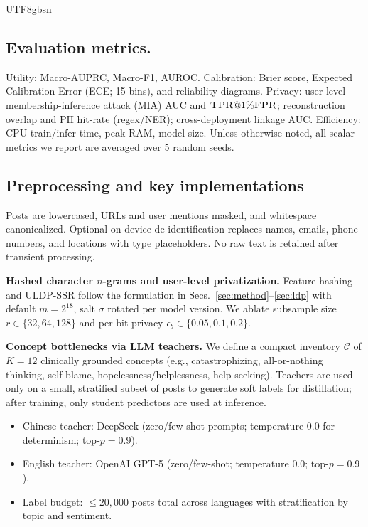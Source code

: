 \documentclass[lettersize,journal]{IEEEtran}
\begin{document}
\begin{CJK*}{UTF8}{gbsn}
\subsection{Evaluation metrics.}
Utility: Macro-\textsc{AUPRC}, Macro-\textsc{F1}, \textsc{AUROC}.
Calibration: Brier score, Expected Calibration Error (ECE; 15 bins), and reliability diagrams.
Privacy: user-level membership-inference attack (\textsc{MIA}) \textsc{AUC} and $\textsc{TPR}@1\%\textsc{FPR}$; reconstruction overlap and \textsc{PII} hit-rate (regex/\textsc{NER}); cross-deployment linkage \textsc{AUC}.
Efficiency: CPU train/infer time, peak RAM, model size. Unless otherwise noted, all scalar metrics we report are averaged over $5$ random seeds.


\subsection{Preprocessing and key implementations}
Posts are lowercased, URLs and user mentions masked, and whitespace canonicalized. Optional on-device de-identification replaces names, emails, phone numbers, and locations with type placeholders. No raw text is retained after transient processing.

\noindent\textbf{Hashed character $n$-grams and user-level privatization.}
Feature hashing and ULDP-SSR follow the formulation in Secs.~\ref{sec:method}--\ref{sec:ldp} with default $m{=}2^{18}$, salt $\sigma$ rotated per model version. We ablate subsample size $r \in \{32,64,128\}$ and per-bit privacy $\epsilon_b \in \{0.05,0.1,0.2\}$.


\noindent\textbf{Concept bottlenecks via LLM teachers.}
We define a compact inventory $\mathcal{C}$ of $K{=}12$ clinically grounded concepts (e.g., catastrophizing, all-or-nothing thinking, self-blame, hopelessness/helplessness, help-seeking). Teachers are used only on a small, stratified subset of posts to generate soft labels for distillation; after training, only student predictors are used at inference.

\begin{itemize}[leftmargin=1.2em, itemsep=2pt]
  \item Chinese teacher: DeepSeek (zero/few-shot prompts; temperature $0.0$ for determinism; top-$p{=}0.9$).
  \item English teacher: OpenAI GPT-5 (zero/few-shot; temperature $0.0$; top-$p{=}0.9$).
  \item Label budget: $\leq 20{,}000$ posts total across languages with stratification by topic and sentiment.
\end{itemize}


\end{CJK*}
\end{document}
